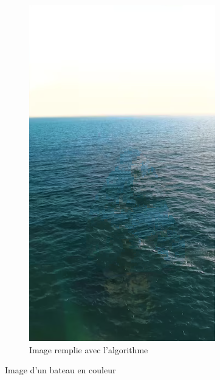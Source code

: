 \documentclass[9pt]{extarticle}
\begin{document}
\begin{figure}[h]
\begin{subfigure}{0.3\textwidth}
        \centering
        \includegraphics[width=\textwidth]{images/image_sailboat_inpaint.png}
        \caption{Image remplie avec l'algorithme}
    \end{subfigure}
    \caption{Image d'un bateau en couleur}
    \label{fig:boat}
\end{figure}
\end{document}
